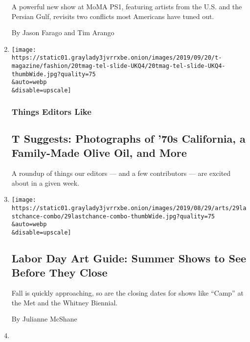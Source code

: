 \begin{enumerate}
  A powerful new show at MoMA PS1, featuring artists from the U.S. and
  the Persian Gulf, revisits two conflicts most Americans have tuned
  out.

  By Jason Farago and Tim Arango
\item
  \href{/2019/09/20/t-magazine/michael-jang-photographs-oracle-olive-oil-culture-style-news.html}{}

  \texttt{[image: https://static01.graylady3jvrrxbe.onion/images/2019/09/20/t-magazine/fashion/20tmag-tel-slide-UKQ4/20tmag-tel-slide-UKQ4-thumbWide.jpg?quality=75\\\&auto=webp\\\&disable=upscale]}

  \hypertarget{things-editors-like}{%
  \subsubsection{Things Editors Like}\label{things-editors-like}}

  \hypertarget{t-suggests-photographs-of-70s-california-a-family-made-olive-oil-and-more}{%
  \subsection{T Suggests: Photographs of '70s California, a Family-Made
  Olive Oil, and
  More}\label{t-suggests-photographs-of-70s-california-a-family-made-olive-oil-and-more}}

  A roundup of things our editors --- and a few contributors --- are
  excited about in a given week.
\item
  \href{/2019/08/29/arts/design/labor-day-art-guide.html}{}

  \texttt{[image: https://static01.graylady3jvrrxbe.onion/images/2019/08/29/arts/29lastchance-combo/29lastchance-combo-thumbWide.jpg?quality=75\\\&auto=webp\\\&disable=upscale]}

  \hypertarget{labor-day-art-guide-summer-shows-to-see-before-they-close}{%
  \subsection{Labor Day Art Guide: Summer Shows to See Before They
  Close}\label{labor-day-art-guide-summer-shows-to-see-before-they-close}}

  Fall is quickly approaching, so are the closing dates for shows like
  ``Camp'' at the Met and the Whitney Biennial.

  By Julianne McShane
\item
  \href{/2019/08/21/arts/design/art-gallery-shows.html}{}


\end{enumerate}
